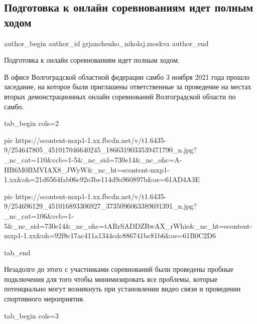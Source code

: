  
 
 
 
 
 
\subsection{Подготовка к онлайн соревнованиям идет полным ходом}
\label{sec:08_11_2021.fb.grjanchenko_nikolaj.moskva.1.onlajn_sorevnovanie_onlajn}
 
\ifcmt
 author_begin
   author_id grjanchenko_nikolaj.moskva
 author_end
\fi

Подготовка к онлайн соревнованиям идет полным ходом.

В офисе Волгоградской областной федерации самбо 3 ноября 2021 года прошло
заседание, на которое были приглашены ответственные  за проведение на местах
вторых демонстрационных онлайн соревнований Волгоградской области по самбо.

\ifcmt
  tab_begin cols=2

     pic https://scontent-mxp1-1.xx.fbcdn.net/v/t1.6435-9/254647805_451017046640245_1866319033539471790_n.jpg?_nc_cat=110&ccb=1-5&_nc_sid=730e14&_nc_ohc=A-HB6M0BMVIAX8_JWyW&_nc_ht=scontent-mxp1-1.xx&oh=21d6564fab06c92e3be114d9a960897b&oe=61AD4A3E

     pic https://scontent-mxp1-1.xx.fbcdn.net/v/t1.6435-9/254696129_451016893306927_3735096063389691391_n.jpg?_nc_cat=106&ccb=1-5&_nc_sid=730e14&_nc_ohc=tARrSADDZRwAX_rWhie&_nc_ht=scontent-mxp1-1.xx&oh=92f8c17ac411a1344cdc886741bc81b6&oe=61B0C2D6

  tab_end
\fi

Незадолго до этого с участниками соревнований были проведены пробные
подключения для того чтобы минимизировать все проблемы, которые потенциально
могут возникнуть при установлении видео связи и проведении спортивного
мероприятия.

\ifcmt
  tab_begin cols=3

